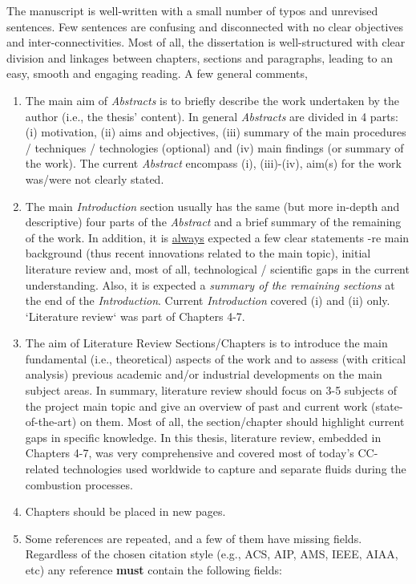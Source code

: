 \documentclass[14pt,twoside]{report}
\begin{document}
The manuscript is well-written with a small number of typos and unrevised sentences. Few sentences are confusing and disconnected with no clear objectives and inter-connectivities. Most of all, the dissertation is well-structured with clear division and linkages between chapters, sections and paragraphs, leading to an easy, smooth and engaging reading. A few general comments,
\begin{enumerate}
%
\item The main aim of {\it Abstracts} is to briefly describe the work undertaken by the author (i.e., the thesis' content). In general {\it Abstracts} are divided in 4 parts: (i) motivation, (ii) aims and objectives, (iii) summary of the main procedures / techniques / technologies (optional) and (iv) main findings (or summary of the work). The current {\it Abstract} encompass (i), (iii)-(iv), aim(s) for the work was/were not clearly stated.
%
\item The main {\it Introduction} section usually has the same (but more in-depth and descriptive) four parts of the {\it Abstract} and a brief summary of the remaining of the work. In addition, it is \underline{always} expected a few clear statements -re main background (thus recent innovations related to the main topic), initial literature review and, most of all, technological / scientific gaps in the current understanding. Also, it is expected a {\it summary of the remaining sections} at the end of the {\it Introduction}.  Current {\it Introduction} covered (i) and (ii) only. `Literature review` was part of Chapters 4-7.
%
\item The aim of Literature Review Sections/Chapters is to introduce the main fundamental (i.e., theoretical) aspects of the work and to assess (with critical analysis) previous academic and/or industrial developments on the main subject areas. In summary, literature review should focus on 3-5 subjects of the project main topic and give an overview of past and current work (state-of-the-art) on them. Most of all, the section/chapter should highlight current gaps in specific knowledge. In this thesis, literature review, embedded in Chapters 4-7, was very comprehensive and covered most of today's CC-related technologies used worldwide to capture and separate fluids during the combustion processes. 
%
\item Chapters should be placed in new pages.
%
\item Some references are repeated, and a few of them have missing fields. Regardless of the chosen citation style (e.g., ACS, AIP, AMS, IEEE, AIAA, etc) any reference {\bf must} contain the following fields: 

\end{enumerate}
\end{document}
